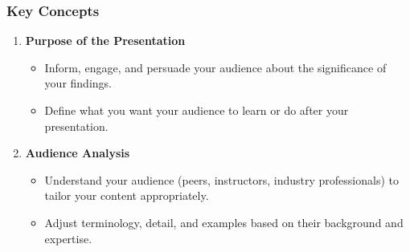 \documentclass[aspectratio=169]{beamer}
\begin{document}
\begin{frame}[fragile]
    \frametitle{Key Concepts}
    \begin{enumerate}
        \item \textbf{Purpose of the Presentation}
            \begin{itemize}
                \item Inform, engage, and persuade your audience about the significance of your findings.
                \item Define what you want your audience to learn or do after your presentation.
            \end{itemize}
        
        \item \textbf{Audience Analysis}
            \begin{itemize}
                \item Understand your audience (peers, instructors, industry professionals) to tailor your content appropriately.
                \item Adjust terminology, detail, and examples based on their background and expertise.
            \end{itemize}
    \end{enumerate}
\end{frame}
\end{document}
